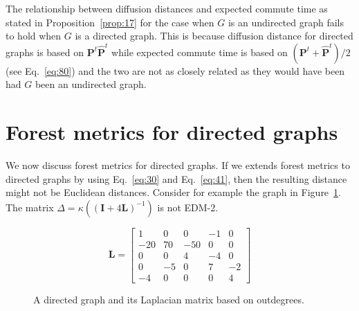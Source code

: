 The relationship between diffusion distances and expected commute time
as stated in Proposition~\ref{prop:17} for the case when $G$ is an
undirected graph fails to hold when $G$ is a directed graph. This is
because diffusion distance for directed graphs is based on
$\mathbf{P}^{t}\hat{\mathbf{P}}^{t}$ while expected commute time is
based on $(\mathbf{P}^{t} + \hat{\mathbf{P}}^{t})/2$ (see
Eq.~\eqref{eq:80}) and the two are not as closely related as they
would have been had $G$ been an undirected graph. 
\section{Forest metrics for directed graphs}
\label{sec:forest-metr-direct}
We now discuss forest metrics
\citep{chebotarev02:_fores_metric_for_graph_vertic} for directed
graphs. If we extends forest metrics to directed graphs by using
Eq.~\eqref{eq:30} and Eq.~\eqref{eq:41}, then the resulting distance
might not be Euclidean distances. Consider for example the graph in
Figure~\ref{fig:directed_graph1}. The matrix $\Delta =
\kappa((\mathbf{I} + 4 \mathbf{L})^{-1})$ is not EDM-2.
\begin{figure}[hbtp]
  \centering
  \begin{minipage}[c]{0.45\textwidth}
    \centering
  \end{minipage}
  \begin{minipage}[c]{0.38\textwidth}
    \begin{equation*}
      \mathbf{L} = \left[ \begin{array}{rrrrr}
          1  & 0  & 0  & -1  & 0 \\
          -20 & 70  & -50  & 0 & 0 \\
          0  & 0 & 4  & -4 & 0 \\
          0 & -5 & 0  & 7 & -2 \\
          -4 & 0 & 0 & 0 & 4
       \end{array} \right ]
    \end{equation*}
  \end{minipage}
    \caption{A directed graph and its Laplacian matrix based on outdegrees.}
    \label{fig:directed_graph1}
\end{figure}

